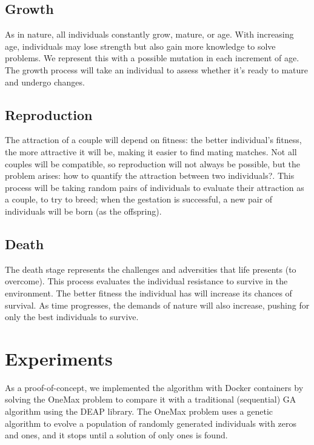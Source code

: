 \documentclass[runningheads]{llncs}
\begin{document}
\subsection{Growth}

As in nature, all individuals constantly grow, mature, or age. With increasing
age, individuals may lose strength but also gain more knowledge to solve
problems. We represent this with a possible mutation in each increment of age.
The growth process will take an individual to assess whether it's ready to
mature and undergo changes.

\subsection{Reproduction}

The attraction of a couple will depend on fitness: the better individual's
fitness, the more attractive it will be, making it easier to find mating
matches. Not all couples will be compatible, so reproduction will not always be
possible, but the problem arises: how to quantify the attraction between two
individuals?. This process will be taking random pairs of individuals to
evaluate their attraction as a couple, to try to breed; when the gestation is
successful, a new pair of individuals will be born (as the offspring).

\subsection{Death}

The death stage represents the challenges and adversities that life presents
(to overcome). This process evaluates the individual resistance to survive in
the environment. The better fitness the individual has will increase its
chances of survival. As time progresses, the demands of nature will also
increase, pushing for only the best individuals to survive.

\section{Experiments} 

As a proof-of-concept, we implemented the algorithm with Docker containers by
solving the OneMax problem to compare it with a traditional (sequential) GA
algorithm using the DEAP library. The OneMax problem uses a genetic algorithm
to evolve a population of randomly generated individuals with zeros and ones,
and it stops until a solution of only ones is found.
\end{document}
